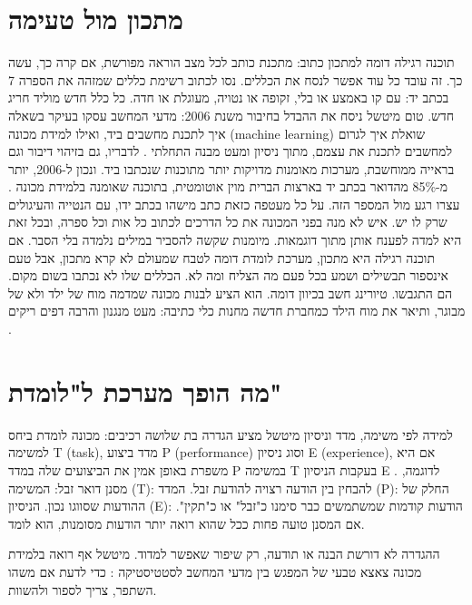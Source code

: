 \section{מתכון מול טעימה}
תוכנה רגילה דומה למתכון כתוב: מתכנת כותב לכל מצב הוראה מפורשת, אם קרה כך, עשה כך. זה עובד כל עוד אפשר לנסח את הכללים. נסו לכתוב רשימת כללים שמזהה את הספרה 7 בכתב יד: עם קו באמצע או בלי, זקופה או נטויה, מעוגלת או חדה. כל כלל חדש מוליד חריג חדש.
טום מיטשל ניסח את ההבדל בחיבור משנת 2006: מדעי המחשב עסקו בעיקר בשאלה איך לתכנת מחשבים ביד, ואילו למידת מכונה (machine learning) שואלת איך לגרום למחשבים לתכנת את עצמם, מתוך ניסיון ומעט מבנה התחלתי \cite{S-ch01-03}. לדבריו, גם בזיהוי דיבור וגם בראייה ממוחשבת, מערכות מאומנות מדויקות יותר מתוכנות שנכתבו ביד. ונכון ל-2006, יותר מ-85\% מהדואר בכתב יד בארצות הברית מוין אוטומטית, בתוכנה שאומנה בלמידת מכונה \cite{S-ch01-03}.
עצרו רגע מול המספר הזה. על כל מעטפה כזאת כתב מישהו בכתב ידו, עם הנטייה והעיגולים שרק לו יש. איש לא מנה בפני המכונה את כל הדרכים לכתוב כל אות וכל ספרה, ובכל זאת היא למדה לפענח אותן מתוך דוגמאות. מיומנות שקשה להסביר במילים נלמדה בלי הסבר.
אם תוכנה רגילה היא מתכון, מערכת לומדת דומה לטבח שמעולם לא קרא מתכון, אבל טעם אינספור תבשילים ושמע בכל פעם מה הצליח ומה לא. הכללים שלו לא נכתבו בשום מקום. הם התגבשו.
טיורינג חשב בכיוון דומה. הוא הציע לבנות מכונה שמדמה מוח של ילד ולא של מבוגר, ותיאר את מוח הילד כמחברת חדשה מחנות כלי כתיבה: מעט מנגנון והרבה דפים ריקים \cite{S-ch01-02}.
\section{מה הופך מערכת ל"לומדת"}
\begin{conceptbox}{למידה לפי משימה, מדד וניסיון}
מיטשל מציע הגדרה בת שלושה רכיבים: מכונה לומדת ביחס למשימה T (task), מדד ביצוע P (performance) וסוג ניסיון E (experience), אם היא משפרת באופן אמין את הביצועים שלה במדד P במשימה T בעקבות הניסיון E \cite{S-ch01-03}.
לדוגמה, מסנן דואר זבל:
המשימה (T): להבחין בין הודעה רצויה להודעת זבל.
המדד (P): החלק של ההודעות שסווגו נכון.
הניסיון (E): הודעות קודמות שמשתמשים כבר סימנו כ"זבל" או כ"תקין".
אם המסנן טועה פחות ככל שהוא רואה יותר הודעות מסומנות, הוא לומד.
\end{conceptbox}
ההגדרה לא דורשת הבנה או תודעה, רק שיפור שאפשר למדוד. מיטשל אף רואה בלמידת מכונה צאצא טבעי של המפגש בין מדעי המחשב לסטטיסטיקה \cite{S-ch01-03}: כדי לדעת אם משהו השתפר, צריך לספור ולהשוות.
